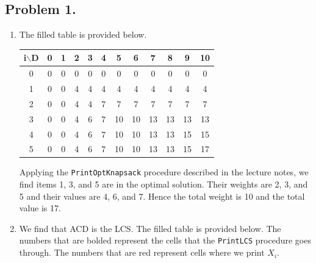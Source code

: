 \documentclass[11pt, letterpaper, titlepage]{article}
\begin{document}
\onehalfspacing

\subsection*{Problem 1.}
\begin{enumerate}[label=\alph*.]
    \item The filled table is provided below.
    
    \footnotesize
    \begin{tabularx}{\textwidth}{cccccccccccc}
        i$\backslash$D &  0 &  1 &  2 &  3 &  4 &  5 &  6 &  7 &  8 &  9 & 10 \\ \hline
                     0 &  0 &  0 &  0 &  0 &  0 &  0 &  0 &  0 &  0 &  0 &  0 \\ \hline
                     1 &  0 &  0 &  4 &  4 &  4 &  4 &  4 &  4 &  4 &  4 &  4 \\ \hline
                     2 &  0 &  0 &  4 &  4 &  7 &  7 &  7 &  7 &  7 &  7 &  7 \\ \hline
                     3 &  0 &  0 &  4 &  6 &  7 & 10 & 10 & 13 & 13 & 13 & 13 \\ \hline
                     4 &  0 &  0 &  4 &  6 &  7 & 10 & 10 & 13 & 13 & 15 & 15 \\ \hline
                     5 &  0 &  0 &  4 &  6 &  7 & 10 & 10 & 13 & 13 & 15 & 17 \\ \hline
    \end{tabularx}
    \normalsize
    Applying the \texttt{PrintOptKnapsack} procedure described in the lecture notes, we find items 1, 3, and 5 are in the optimal solution. Their weights are 2, 3, and 5 and their values are 4, 6, and 7. Hence the total weight is 10 and the total value is 17.
    
    \item We find that ACD is the LCS. The filled table is provided below. The numbers that are bolded represent the cells that the \texttt{PrintLCS} procedure goes through. The numbers that are red represent cells where we print $X_i$.
    

\end{enumerate}
\end{document}
